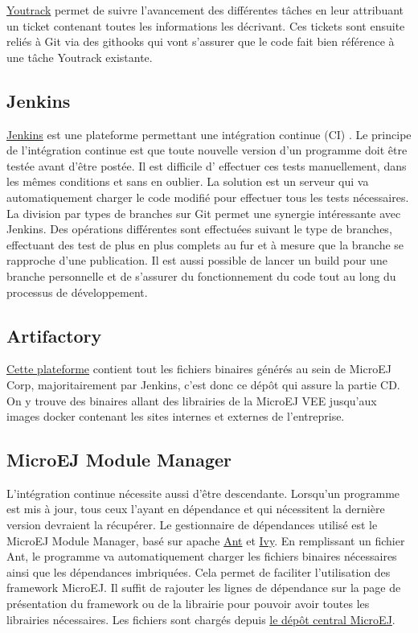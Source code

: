 \documentclass[french,a4paper,12pt]{report}
\begin{document}
\href{https://www.jetbrains.com/youtrack/}{Youtrack} permet de suivre l'avancement des différentes tâches en leur attribuant un ticket contenant toutes les informations les décrivant.
Ces tickets sont ensuite reliés à Git via des githooks qui vont s'assurer que le code fait bien référence à une tâche Youtrack existante.

\subsection{Jenkins}

\href{https://www.jenkins.io/}{Jenkins} est une plateforme permettant une intégration continue (CI) . Le principe de l’intégration continue est que toute nouvelle version d’un programme doit être testée avant d’être postée. Il est difficile d' effectuer ces tests manuellement, dans les mêmes conditions et sans en oublier. La solution est un serveur qui va automatiquement charger le code modifié pour effectuer tous les tests nécessaires. La division par types de branches sur Git permet une synergie intéressante avec Jenkins. Des opérations différentes sont effectuées suivant le type de branches, effectuant des test de plus en plus complets au fur et à mesure que la branche se rapproche d'une publication. Il est aussi possible de lancer un build pour une branche personnelle et de s’assurer du fonctionnement du code tout au long du processus de développement.

\subsection{Artifactory}

\href{https://www.jfrog.com/}{Cette plateforme} contient tout les fichiers binaires générés au sein de MicroEJ Corp, majoritairement par Jenkins, c'est donc ce dépôt qui assure la partie CD. On y trouve des binaires allant des librairies de la MicroEJ VEE jusqu'aux images docker contenant les sites internes et externes de l'entreprise.

\subsection{MicroEJ Module Manager}
L’intégration continue nécessite aussi d'être descendante. Lorsqu'un programme est mis à jour, tous ceux l'ayant en dépendance et qui nécessitent la dernière version devraient la récupérer.
Le gestionnaire de dépendances utilisé est le MicroEJ Module Manager, basé sur apache \href{https://ant.apache.org/}{Ant} et \href{https://ant.apache.org/ivy/}{Ivy}. En remplissant un fichier Ant, le programme va automatiquement charger les fichiers binaires nécessaires ainsi que les dépendances imbriquées. Cela permet de faciliter l’utilisation des framework MicroEJ. Il suffit de rajouter les lignes de dépendance sur la page de présentation du framework ou de la librairie pour pouvoir avoir toutes les librairies nécessaires. Les fichiers sont chargés depuis \href{https://docs.microej.com/en/latest/overview/repository.html#central-repository}{le dépôt central MicroEJ}.
\end{document}
